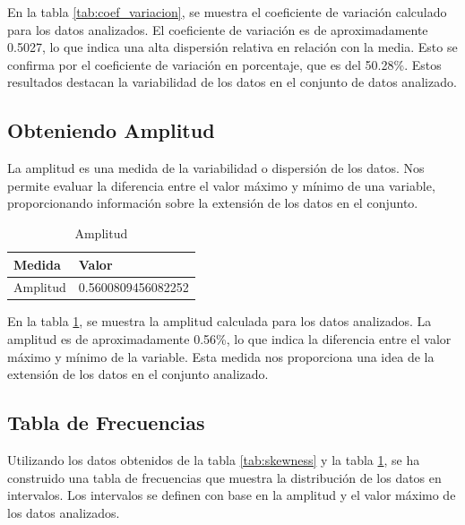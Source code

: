 En la tabla \ref{tab:coef_variacion}, se muestra el coeficiente de variación calculado para los datos analizados. El coeficiente de variación es de aproximadamente 0.5027, lo que indica una alta dispersión relativa en relación con la media. Esto se confirma por el coeficiente de variación en porcentaje, que es del 50.28\%. Estos resultados destacan la variabilidad de los datos en el conjunto de datos analizado.

\subsection{Obteniendo Amplitud}

La amplitud es una medida de la variabilidad o dispersión de los datos. Nos permite evaluar la diferencia entre el valor máximo y mínimo de una variable, proporcionando información sobre la extensión de los datos en el conjunto.

\begin{table}[H]
    \centering
    \caption{Amplitud}
    \begin{tabular}{ll}
        \hline
        \textbf{Medida} & \textbf{Valor}     \\
        \hline
        Amplitud        & 0.5600809456082252 \\
        \hline
    \end{tabular}%
    \label{tab:amplitud}%
\end{table}%

En la tabla \ref{tab:amplitud}, se muestra la amplitud calculada para los datos analizados. La amplitud es de aproximadamente 0.56\%, lo que indica la diferencia entre el valor máximo y mínimo de la variable. Esta medida nos proporciona una idea de la extensión de los datos en el conjunto analizado.

\subsection{Tabla de Frecuencias}

Utilizando los datos obtenidos de la tabla \ref{tab:skewness} y la tabla \ref{tab:amplitud}, se ha construido una tabla de frecuencias que muestra la distribución de los datos en intervalos. Los intervalos se definen con base en
la amplitud y el valor máximo de los datos analizados.


